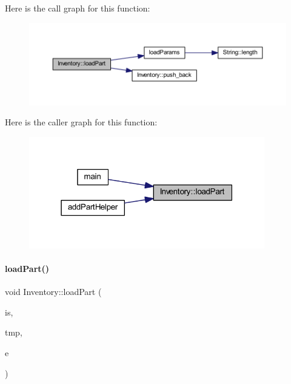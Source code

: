 Here is the call graph for this function\+:
\nopagebreak
\begin{figure}[H]
\begin{center}
\leavevmode
\includegraphics[width=350pt]{class_inventory_a78912f140decdd10037eb682cf295d72_cgraph}
\end{center}
\end{figure}
Here is the caller graph for this function\+:
\nopagebreak
\begin{figure}[H]
\begin{center}
\leavevmode
\includegraphics[width=291pt]{class_inventory_a78912f140decdd10037eb682cf295d72_icgraph}
\end{center}
\end{figure}
\mbox{\label{class_inventory_a9dd64f268a7a5cca611b5f749ec33f96}} 
\paragraph{\texorpdfstring{loadPart()}{loadPart()}\hspace{0.1cm}{\footnotesize\ttfamily [2/2]}}
{\footnotesize\ttfamily void Inventory\+::load\+Part (\begin{DoxyParamCaption}\item[{std\+::istream \&}]{is,  }\item[{\mbox{\hyperlink{struct_temp_input}{Temp\+Input}} \&}]{tmp,  }\item[{\mbox{\hyperlink{_parts_8h_abddff37837f171d72a2e16a1448a3943}{enum\+Part}}}]{e }\end{DoxyParamCaption})}



